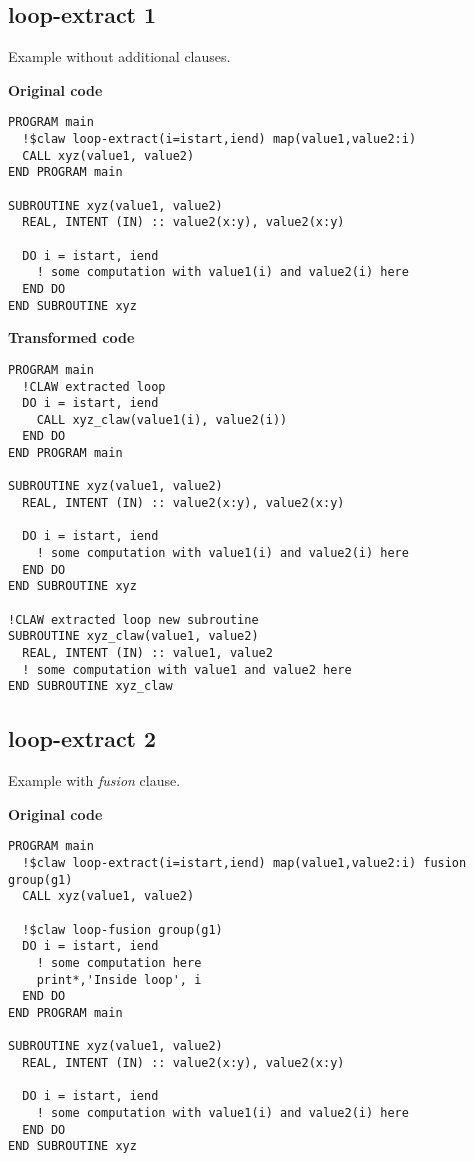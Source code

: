 \subsection{loop-extract 1}
\label{loop-extract1}
Example without additional clauses. 

\textbf{Original code}
\begin{lstlisting}
PROGRAM main
  !$claw loop-extract(i=istart,iend) map(value1,value2:i)
  CALL xyz(value1, value2)
END PROGRAM main

SUBROUTINE xyz(value1, value2)
  REAL, INTENT (IN) :: value2(x:y), value2(x:y)

  DO i = istart, iend
    ! some computation with value1(i) and value2(i) here
  END DO
END SUBROUTINE xyz
\end{lstlisting}


\textbf{Transformed code}
\begin{lstlisting}
PROGRAM main
  !CLAW extracted loop
  DO i = istart, iend
    CALL xyz_claw(value1(i), value2(i))
  END DO
END PROGRAM main

SUBROUTINE xyz(value1, value2)
  REAL, INTENT (IN) :: value2(x:y), value2(x:y)

  DO i = istart, iend
    ! some computation with value1(i) and value2(i) here
  END DO
END SUBROUTINE xyz

!CLAW extracted loop new subroutine
SUBROUTINE xyz_claw(value1, value2)
  REAL, INTENT (IN) :: value1, value2
  ! some computation with value1 and value2 here
END SUBROUTINE xyz_claw
\end{lstlisting}

\subsection{loop-extract 2}
\label{loop-extract2}
Example with \textit{fusion} clause. 

\textbf{Original code}
\begin{lstlisting}
PROGRAM main
  !$claw loop-extract(i=istart,iend) map(value1,value2:i) fusion group(g1)
  CALL xyz(value1, value2)

  !$claw loop-fusion group(g1)
  DO i = istart, iend
    ! some computation here
    print*,'Inside loop', i
  END DO
END PROGRAM main

SUBROUTINE xyz(value1, value2)
  REAL, INTENT (IN) :: value2(x:y), value2(x:y)

  DO i = istart, iend
    ! some computation with value1(i) and value2(i) here
  END DO
END SUBROUTINE xyz
\end{lstlisting}


